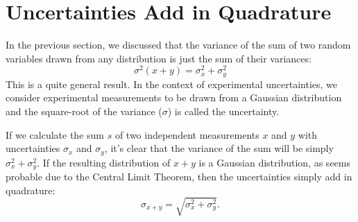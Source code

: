 \documentclass[12pt]{article}
\begin{document}
\section{Uncertainties Add in Quadrature}

In the previous section, we discussed that the variance of the sum of two random variables drawn from any distribution is just the sum of their variances:
\begin{displaymath}
\sigma^2(x+y) = \sigma^2_x + \sigma^2_y
\end{displaymath}
This is a quite general result.  In the context of experimental uncertainties, we consider experimental measurements to be drawn from a Gaussian distribution and the square-root of the variance ($\sigma$) is called the uncertainty.

If we calculate the sum $s$ of two independent measurements $x$ and $y$ with uncertainties $\sigma_x$ and $\sigma_y$, it's clear that the variance of the sum will be simply $\sigma^2_x + \sigma^2_y$.  If the resulting distribution of $x+y$ is a Gaussian distribution, as seems probable due to the Central Limit Theorem, then the uncertainties simply add in quadrature:
\begin{displaymath}
\sigma_{x+y} = \sqrt{\sigma^2_x + \sigma^2_y}.
\end{displaymath}
\end{document}
